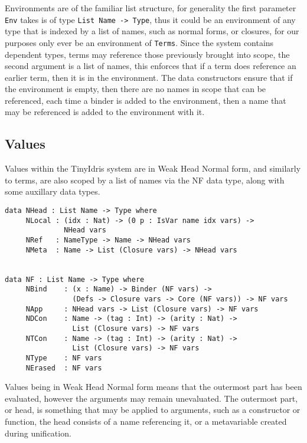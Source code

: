 \documentclass[a4paper]{article}
\begin{document}
Environments are of the familiar list structure, for generality the 
first parameter \texttt{Env} takes is of type \texttt{List Name -> Type}, thus it 
could be an environment of any type that is indexed by a list of names,
such as normal forms, or closures, for our purposes only ever be an 
environment of \texttt{Terms}. Since the system contains dependent types, 
terms may reference those previously brought into scope, the second
argument is a list of names, this enforces that if a term does 
reference an earlier term, then it is in the environment. The data 
constructors ensure that if the environment is empty, then there are 
no names in scope that can be referenced, each time a binder is added
to the environment, then a name that may be referenced is added to the 
environment with it.  

\subsection{Values}
\label{sec:org3d64566}
Values within the TinyIdris system are in Weak Head Normal form, and 
similarly to terms, are also scoped by a list of names via the NF data
type, along with some auxillary data types. 

\begin{center}
\begin{verbatim}
data NHead : List Name -> Type where
	 NLocal : (idx : Nat) -> (0 p : IsVar name idx vars) ->
			  NHead vars
	 NRef   : NameType -> Name -> NHead vars
	 NMeta  : Name -> List (Closure vars) -> NHead vars


data NF : List Name -> Type where
	 NBind    : (x : Name) -> Binder (NF vars) ->
				(Defs -> Closure vars -> Core (NF vars)) -> NF vars
	 NApp     : NHead vars -> List (Closure vars) -> NF vars
	 NDCon    : Name -> (tag : Int) -> (arity : Nat) ->
				List (Closure vars) -> NF vars
	 NTCon    : Name -> (tag : Int) -> (arity : Nat) ->
				List (Closure vars) -> NF vars
	 NType    : NF vars
	 NErased  : NF vars
\end{verbatim}
\end{center}

Values being in Weak Head Normal form means that the outermost part has 
been evaluated, however the arguments may remain unevaluated. The 
outermost part, or head, is something that may be applied to arguments, 
such as a constructor or function, the head consists of a
name referencing it, or a metavariable created during unification. 
\end{document}
